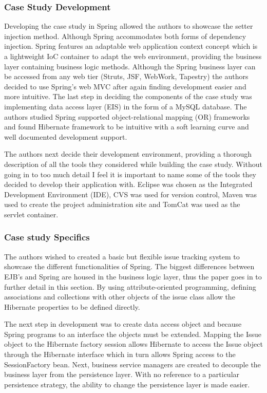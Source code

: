 \documentclass{article}
\begin{document}
		\subsubsection{Case Study Development}
		Developing the case study in Spring allowed the authors to showcase the setter injection method. Although Spring accommodates both forms of dependency injection. Spring features an adaptable web application context concept which is a lightweight IoC container to adapt the web environment, providing the business layer containing business logic methods. Although the Spring business layer can be accessed from any web tier (Struts, JSF, WebWork, Tapestry) the authors decided to use Spring’s web MVC after again finding development easier and more intuitive. The last step in deciding the components of the case study was implementing data access layer (EIS) in the form of a MySQL database. The authors studied Spring supported object-relational mapping (OR) frameworks and found Hibernate framework to be intuitive with a soft learning curve and well documented development support.
		
		The authors next decide their development environment, providing a thorough description of all the tools they considered while building the case study. Without going in to too much detail I feel it is important to name some of the tools they decided to develop their application with. Eclipse was chosen as the Integrated Development Environment (IDE), CVS was used for version control, Maven was used to create the project administration site and TomCat was used as the servlet container.
		
		\subsubsection{Case study Specifics}
		The authors wished to created a basic but flexible issue tracking system to showcase the different functionalities of Spring. The biggest differences between EJB’s and Spring are housed in the business logic layer, thus the paper goes in to further detail in this section. By using attribute-oriented programming, defining associations and collections with other objects of the issue class allow the Hibernate properties to be defined directly. 
		
		The next step in development was to create data access object and because Spring programs to an interface the objects must be extended. Mapping the Issue object to the Hibernate factory session allows Hibernate to access the Issue object through the Hibernate interface which in turn allows Spring access to the SessionFactory bean. Next, business service managers are created to decouple the business layer from the persistence layer. With no reference to a particular persistence strategy, the ability to change the persistence layer is made easier.
		
\end{document}

